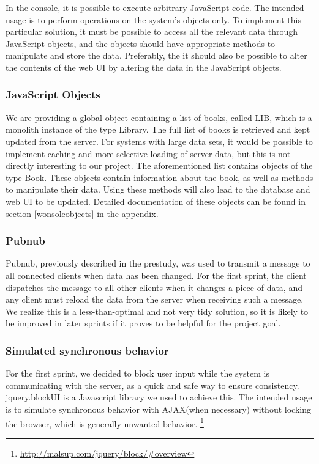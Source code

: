 In the console, it is possible to execute arbitrary JavaScript code. The intended usage is to perform operations on the system's objects only. To implement this particular solution, it must be possible to access all the relevant data through JavaScript objects, and the objects should have appropriate methods to manipulate and store the data. Preferably, the it should also be possible to alter the contents of the web UI by altering the data in the JavaScript objects.

\subsubsection{JavaScript Objects}
We are providing a global object containing a list of books, called LIB, which is a monolith instance of the type Library. The full list of books is retrieved and kept updated from the server. For systems with large data sets, it would be possible to implement caching and more selective loading of server data, but this is not directly interesting to our project. The aforementioned list contains objects of the type Book. These objects contain information about the book, as well as methods to manipulate their data. Using these methods will also lead to the database and web UI to be updated. Detailed documentation of these objects can be found in section \ref{wonsoleobjects} in the appendix.

\subsubsection{Pubnub}
Pubnub, previously described in the prestudy, was used to transmit a message to all connected clients when data has been changed. For the first sprint, the client dispatches the message to all other clients when it changes a piece of data, and any client must reload the data from the server when receiving such a message. We realize this is a less-than-optimal and not very tidy solution, so it is likely to be improved in later sprints if it proves to be helpful for the project goal.

\subsubsection{Simulated synchronous behavior}
For the first sprint, we decided to block user input while the system is communicating with the server, as a quick and safe way to ensure consistency. jquery.blockUI is a Javascript library we used to achieve this. The intended usage is to simulate synchronous behavior with AJAX(when necessary) without locking the browser, which is generally unwanted behavior.
\footnote{\url{http://malsup.com/jquery/block/\#overview}}

